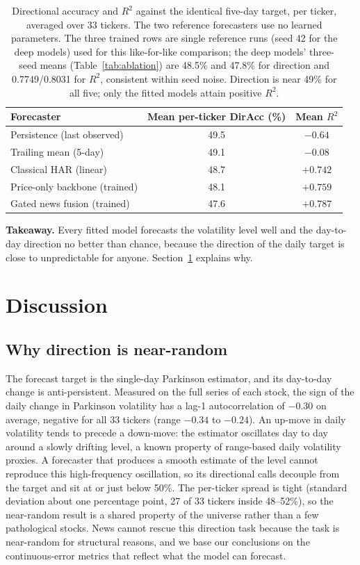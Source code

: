 \documentclass[runningheads]{llncs}
\newcommand{\rsqBB}{0.7749}
\newcommand{\rsqNews}{0.8031}
\newcommand{\ntick}{33}
\begin{document}
\begin{table}[t]
\caption{Directional accuracy and $R^2$ against the identical five-day target, per ticker, averaged
over \ntick{} tickers. The two reference forecasters use no learned parameters. The three trained
rows are single reference runs (seed 42 for the deep models) used for this like-for-like comparison;
the deep models' three-seed means (Table~\ref{tab:ablation}) are 48.5\% and 47.8\% for direction and
\rsqBB{}/\rsqNews{} for $R^2$, consistent within seed noise. Direction is near 49\% for all five;
only the fitted models attain positive $R^2$.}
\label{tab:refs}
\centering
\begin{tabular}{lcc}
\toprule
Forecaster & Mean per-ticker DirAcc (\%) & Mean $R^2$ \\
\midrule
Persistence (last observed) & 49.5 & $-0.64$ \\
Trailing mean (5-day)       & 49.1 & $-0.08$ \\
Classical HAR (linear)      & 48.7 & $+0.742$ \\
Price-only backbone (trained) & 48.1 & $+0.759$ \\
Gated news fusion (trained) & 47.6 & $+0.787$ \\
\bottomrule
\end{tabular}
\end{table}

\smallskip
\noindent\textbf{Takeaway.} Every fitted model forecasts the volatility level well and the
day-to-day direction no better than chance, because the direction of the daily target is close to
unpredictable for anyone. Section~\ref{sec:discussion} explains why.

\section{Discussion}
\label{sec:discussion}

\subsection{Why direction is near-random}
The forecast target is the single-day Parkinson estimator, and its day-to-day change is
anti-persistent. Measured on the full series of each stock, the sign of the daily change in
Parkinson volatility has a lag-1 autocorrelation of $-0.30$ on average, negative for all \ntick{}
tickers (range $-0.34$ to $-0.24$). An up-move in daily volatility tends to precede a
down-move: the estimator oscillates day to day around a slowly drifting level, a known property of
range-based daily volatility proxies. A forecaster that produces a smooth estimate of the level
cannot reproduce this high-frequency oscillation, so its directional calls decouple from the target
and sit at or just below 50\%. The per-ticker spread is tight (standard deviation about one
percentage point, 27 of \ntick{} tickers inside 48--52\%), so the near-random result is a shared
property of the universe rather than a few pathological stocks. News cannot rescue this direction
task because the task is near-random for structural reasons, and we base our conclusions on the
continuous-error metrics that reflect what the model can forecast.
\end{document}
